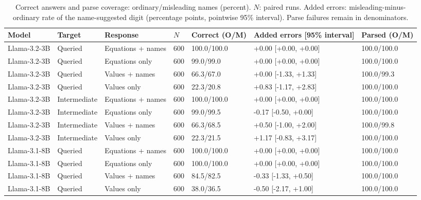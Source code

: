 \begin{table}[t]
\centering\small\setlength{\tabcolsep}{3pt}
\begin{tabular}{@{}p{}p{}p{}p{}p{}p{}p{}@{}}
\toprule
Model & Target & Response & $N$ & Correct (O/M) & Added errors [95\% interval] & Parsed (O/M) \\
\midrule
Llama-3.2-3B & Queried & Equations + names & 600 & 100.0/100.0 & +0.00 [+0.00, +0.00] & 100.0/100.0 \\
Llama-3.2-3B & Queried & Equations only & 600 & 99.0/99.0 & +0.00 [+0.00, +0.00] & 100.0/100.0 \\
Llama-3.2-3B & Queried & Values + names & 600 & 66.3/67.0 & +0.00 [-1.33, +1.33] & 100.0/99.3 \\
Llama-3.2-3B & Queried & Values only & 600 & 22.3/20.8 & +0.83 [-1.17, +2.83] & 100.0/100.0 \\
Llama-3.2-3B & Intermediate & Equations + names & 600 & 100.0/100.0 & +0.00 [+0.00, +0.00] & 100.0/100.0 \\
Llama-3.2-3B & Intermediate & Equations only & 600 & 99.0/99.5 & -0.17 [-0.50, +0.00] & 100.0/100.0 \\
Llama-3.2-3B & Intermediate & Values + names & 600 & 66.3/68.5 & +0.50 [-1.00, +2.00] & 100.0/99.8 \\
Llama-3.2-3B & Intermediate & Values only & 600 & 22.3/21.5 & +1.17 [-0.83, +3.17] & 100.0/100.0 \\
Llama-3.1-8B & Queried & Equations + names & 600 & 100.0/100.0 & +0.00 [+0.00, +0.00] & 100.0/100.0 \\
Llama-3.1-8B & Queried & Equations only & 600 & 100.0/100.0 & +0.00 [+0.00, +0.00] & 100.0/100.0 \\
Llama-3.1-8B & Queried & Values + names & 600 & 84.5/82.5 & -0.33 [-1.33, +0.50] & 100.0/100.0 \\
Llama-3.1-8B & Queried & Values only & 600 & 38.0/36.5 & -0.50 [-2.17, +1.00] & 100.0/100.0 \\
\bottomrule
\end{tabular}
\caption{Correct answers and parse coverage: ordinary/misleading names (percent). $N$: paired runs. Added errors: misleading-minus-ordinary rate of the name-suggested digit (percentage points, pointwise 95\% interval). Parse failures remain in denominators. }
\label{tab:r7-formats-cells-1}
\end{table}

